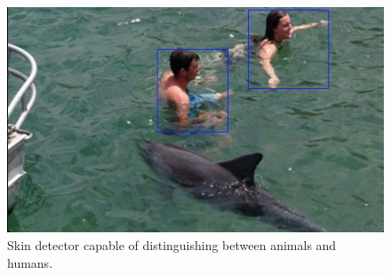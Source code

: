 \begin{figure}[H]
    \centering
        \includegraphics[scale=0.7]{Images/humanDolphin.png}
    \caption{Skin detector capable of distinguishing between animals and humans.}
    \label{fig:humanAndDolphin}
\end{figure}


